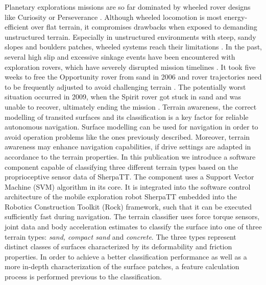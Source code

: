 \documentclass{article}
\begin{document}
Planetary explorations missions are so far dominated by wheeled rover designs like Curiosity
or Perseverance \cite{moeller2021, welch2013}. Although wheeled locomotion is most energy-efficient
over flat terrain, it compromises drawbacks when exposed to demanding unstructured
terrain. Especially in unstructured environments with steep, sandy slopes and boulders
patches, wheeled systems reach their limitations \cite{kolvenbach2021}. In the past, several high slip and
excessive sinkage events have been encountered with exploration rovers, which have severely
disrupted mission timelines \cite{gonzalez2018}. It took five weeks to free the Opportunity
rover from sand in 2006 \cite{young2006} and rover trajectories need to be frequently adjusted to avoid
challenging terrain \cite{arvidson2017}. The potentially worst situation occurred in 2009, when the
Spirit rover got stuck in sand and was unable to recover, ultimately ending the mission
\cite{webster2009}. 
Terrain awareness, the correct modelling of transited surfaces and its classification is a key factor for reliable autonomous navigation. 
Surface modelling can be used for navigation in order to avoid operation problems like the ones previously described. 
Moreover, terrain awareness may enhance navigation capabilities, if drive settings are adapted in accordance to the 
terrain properties.
In this publication we introduce a software component capable of classifying three different terrain types based on the proprioceptive sensor data of SherpaTT. 
The component uses a Support Vector Machine (SVM) algorithm \cite{vapnik1992,cristianini2000} in its core. It is integrated into the software control architecture of the mobile exploration robot SherpaTT embedded into the Robotics Construction Toolkit (Rock) framework, such that it can be executed sufficiently fast during navigation. The terrain classifier uses force torque sensors, joint data and body acceleration estimates to classify the surface into one of three terrain types: \emph{sand, compact sand} and \emph{concrete}.
The three types represent distinct classes of surfaces characterized by its deformability and friction properties. In order to achieve a better classification performance as well as a more in-depth characterization of the surface patches, a feature calculation process is performed previous to the classification. 
\end{document}
